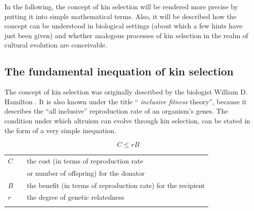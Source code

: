 In the following, the concept of kin selection will be rendered more precise by
putting it into simple mathematical terms. Also, it will be described how
the concept can be understood in biological settings (about which a few hints
have just been given) and whether analogous processes of kin selection in the
realm of cultural evolution are conceivable.

\subsection{The fundamental inequation of kin selection}

The concept of kin selection was originally described by the biologist William
D. Hamilton \cite[]{hamilton:1964}. It is also known under the title ``{\em
inclusive fitness} theory'', because it describes the ``all inclusive''
reproduction rate of an organism's genes. The condition under which altruism
can evolve through kin selection, can be stated in the form of a very simple
inequation.

\begin{equation}
\label{inclusiveFitnessInequation}
C \le rB
\end{equation}
\begin{tabular}{lll}
  $C$  & & the cost (in terms of reproduction rate \\
       & & or number of offspring) for the donator \\
  $B$  & & the benefit (in terms of reproduction rate) for the recipient \\
  $r$  & & the degree of genetic relatedness \\
& & \\
\end{tabular}

